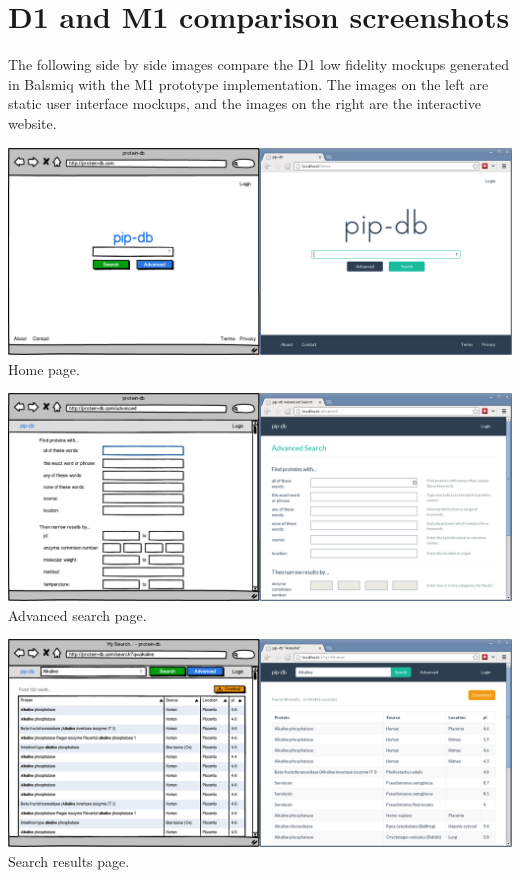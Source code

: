 \chapter{D1 and M1 comparison screenshots}\label{app:d1-m1-comparison}

The following side by side images compare the D1 low fidelity mockups
generated in Balsmiq with the M1 prototype implementation. The images
on the left are static user interface mockups, and the images on the
right are the interactive website.\\

\begin{center}

\noindent\includegraphics[width=\textwidth]{assets/m1-comparison-homepage}
Home page.

\br{}

\noindent\includegraphics[width=\textwidth]{assets/m1-comparison-advanced}
Advanced search page.

\br{}

\noindent\includegraphics[width=\textwidth]{assets/m1-comparison-results}
Search results page.


\end{center}
